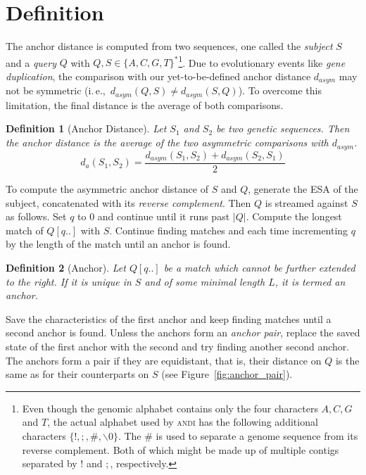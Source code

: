 \documentclass[a4paper,
  10pt,
  english,
  DIV=12,
  BCOR=8mm]{scrbook}
\newcommand{\algo}[1]{\textsc{{#1}}}
\newtheorem{definition}{Definition}
\begin{document}
\section{Definition}

The anchor distance is computed from two sequences, one called the \emph{subject} $S$ and a \emph{query} $Q$ with $Q,S \in \{A,C,G,T\}^*$\footnote{Even though the genomic alphabet contains only the four characters $A,C,G$ and $T$, the actual alphabet used by \algo{andi} has the following additional characters $\{!, ;, \#, \backslash 0 \}$. The $\#$ is used to separate a genome sequence from its reverse complement. Both of which might be made up of multiple contigs separated by $!$ and $;$, respectively.}. Due to evolutionary events like \emph{gene duplication}, the comparison with our yet-to-be-defined anchor distance $d_\mathit{asym}$ may not be symmetric (i.\,e.,\ $d_\mathit{asym}(Q,S) \ne d_\mathit{asym}(S,Q)$). To overcome this limitation, the final distance is the average of both comparisons.


\begin{definition}[Anchor Distance] Let $S_1$ and $S_2$ be two genetic sequences. Then the \emph{anchor distance} is the average of the two asymmetric comparisons with $d_\mathit{asym}$.
\[
  d_a(S_1, S_2) = \frac{d_\mathit{asym}(S_1,S_2)+d_\mathit{asym}(S_2,S_1)}{2}
\]
\end{definition}

To compute the asymmetric anchor distance of $S$ and $Q$, generate the \ac{ESA} of the subject, concatenated with its \emph{reverse complement}. Then $Q$ is streamed against $S$ as follows. Set $q$ to $0$ and continue until it runs past $|Q|$. Compute the longest match of $Q[q..]$ with $S$. Continue finding matches and each time incrementing $q$ by the length of the match until an anchor is found.

\begin{definition}[Anchor]
  Let $Q[q..]$ be a match which cannot be further extended to the right. If it is unique in $S$ and of some minimal length $L$, it is termed an \emph{anchor}.
\end{definition}

Save the characteristics of the first anchor and keep finding matches until a second anchor is found. Unless the anchors form an \emph{anchor pair}, replace the saved state of the first anchor with the second and try finding another second anchor. The anchors form a pair if they are equidistant, that is, their distance on $Q$ is the same as for their counterparts on $S$ (see Figure~\ref{fig:anchor_pair}).
\end{document}
